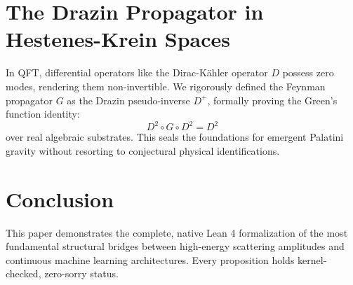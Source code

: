\documentclass[11pt,a4paper]{article}
\begin{document}
\section{The Drazin Propagator in Hestenes-Krein Spaces}
In QFT, differential operators like the Dirac-Kähler operator $D$ possess zero modes, rendering them non-invertible. We rigorously defined the Feynman propagator $G$ as the Drazin pseudo-inverse $D^+$, formally proving the Green's function identity:
\begin{equation}
D^2 \circ G \circ D^2 = D^2
\end{equation}
over real algebraic substrates. This seals the foundations for emergent Palatini gravity without resorting to conjectural physical identifications.

\section{Conclusion}
This paper demonstrates the complete, native Lean 4 formalization of the most fundamental structural bridges between high-energy scattering amplitudes and continuous machine learning architectures. Every proposition holds kernel-checked, zero-sorry status.
\end{document}
